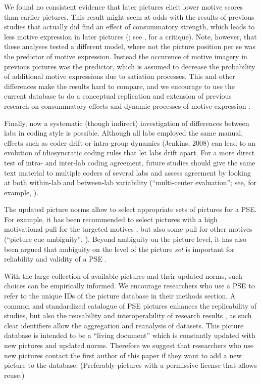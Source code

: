 \documentclass[man,a4paper,mask]{apa6}\usepackage[]{graphicx}\usepackage[]{color}
\begin{document}
We found no consistent evidence that later pictures elicit lower motive scores than earlier pictures. This result might seem at odds with the results of previous studies that actually did find an effect of consummatory strength, which leads to less motive expression in later pictures (; see , for a critique). Note, however, that these analyses tested a different model, where not the picture position per se was the predictor of motive expression. Instead the occurence of motive imagery in previous pictures was the predictor, which is assumed to decrease the probability of additional motive expressions due to satiation processes. This and other differences make the results hard to compare, and we encourage to use the current database to do a conceptual replication and extension of previous research on consummatory effects and dynamic processes of motive expression \parencite{atkinson_dynamics_1970}.

Finally, now a systematic (though indirect) investigation of differences between labs in coding style is possible. 
Although all labs employed the same manual, effects such as coder drift \parencite{schultheiss_MeasuringImplicitMotives_2007} or intra-group dynamics (Jenkins, 2008) can lead to an evolution of idiosyncratic coding rules that let labs drift apart.
For a more direct test of intra- and inter-lab coding agreement, future studies should give the same text material to multiple coders of several labs and assess agreement by looking at both within-lab and between-lab variability (``multi-center evaluation''; see, for example, ).

The updated picture norms allow to select appropriate sets of pictures for a PSE. For example, it has been recommended to select pictures with a high motivational pull for the targeted motives \parencite{schultheiss_MeasuringImplicitMotives_2007,smith_MethodologicalConsiderationsSteps_1992}, but also some pull for other motives (``picture cue ambiguity'', ). Beyond ambiguity on the picture level, it has also been argued that ambiguity on the level of the picture \emph{set} is important for reliability and validity of a PSE \parencite{ramsay_SetAmbiguityKey_2013}. 

With the large collection of available pictures and their updated norms, such choices can be empirically informed. We encourage researchers who use a PSE to refer to the unique IDs of the picture database in their methods section. A common and standardized catalogue of PSE pictures enhances the replicability of studies, but also the reusability and interoperability of research results \parencite{wilkinson_FAIRGuidingPrinciples_2016}, as such clear identifiers allow the aggregation and reanalysis of datasets. 
This picture database is intended to be a ``living document'' which is constantly updated with new pictures and updated norms. Therefore we suggest that researchers who use new pictures contact the first author of this paper if they want to add a new picture to the database. (Preferably pictures with a permissive license that allows reuse.) 
\end{document}
